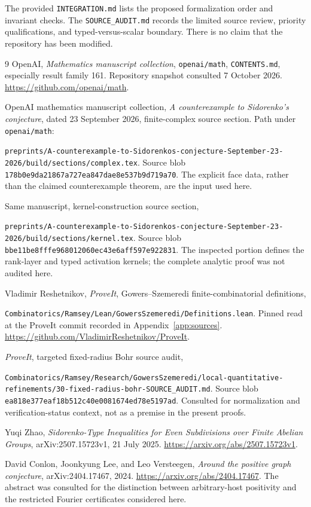 \documentclass[11pt]{article}
\numberwithin{equation}{section}
\theoremstyle{definition}
\theoremstyle{remark}
\begin{document}
The provided \texttt{INTEGRATION.md} lists the proposed formalization
order and invariant checks. The \texttt{SOURCE\_AUDIT.md} records the
limited source review, priority qualifications, and typed-versus-scalar
boundary. There is no claim that the repository has been modified.

\begin{thebibliography}{9}
OpenAI, \emph{Mathematics manuscript collection},
\texttt{openai/math}, \texttt{CONTENTS.md}, especially result family 161.
Repository snapshot consulted 7 October 2026.
\url{https://github.com/openai/math}.

OpenAI mathematics manuscript collection,
\emph{A counterexample to Sidorenko's conjecture}, dated
23 September 2026, finite-complex source section.
Path under \texttt{openai/math}:\par
\nolinkurl{preprints/A-counterexample-to-Sidorenkos-conjecture-September-23-2026/build/sections/complex.tex}.
Source blob \texttt{178b0e9da21867a727ea847dae8e537b9d719a70}.
The explicit face data, rather than the claimed counterexample theorem,
are the input used here.

Same manuscript, kernel-construction source section,\par
\nolinkurl{preprints/A-counterexample-to-Sidorenkos-conjecture-September-23-2026/build/sections/kernel.tex}.
Source blob \texttt{bbe11be8fffe968012060ec43e6aff597e922831}.
The inspected portion defines the rank-layer and typed activation
kernels; the complete analytic proof was not audited here.

Vladimir Reshetnikov, \emph{ProveIt},
Gowers--Szemeredi finite-combinatorial definitions,\par
\nolinkurl{Combinatorics/Ramsey/Lean/GowersSzemeredi/Definitions.lean}.
Pinned read at the ProveIt commit recorded in Appendix~\ref{app:sources}.
\url{https://github.com/VladimirReshetnikov/ProveIt}.

\emph{ProveIt}, targeted fixed-radius Bohr source audit,\par
\nolinkurl{Combinatorics/Ramsey/Research/GowersSzemeredi/local-quantitative-refinements/30-fixed-radius-bohr-SOURCE_AUDIT.md}.
Source blob \texttt{ea818e377eaf18b512c40e0081674ed78e5197ad}.
Consulted for normalization and verification-status context, not as a
premise in the present proofs.

Yuqi Zhao, \emph{Sidorenko-Type Inequalities for Even Subdivisions over
Finite Abelian Groups}, arXiv:2507.15723v1, 21 July 2025.
\url{https://arxiv.org/abs/2507.15723v1}.

David Conlon, Joonkyung Lee, and Leo Versteegen,
\emph{Around the positive graph conjecture}, arXiv:2404.17467, 2024.
\url{https://arxiv.org/abs/2404.17467}.
The abstract was consulted for the distinction between arbitrary-host
positivity and the restricted Fourier certificates considered here.
\end{thebibliography}
\end{document}
